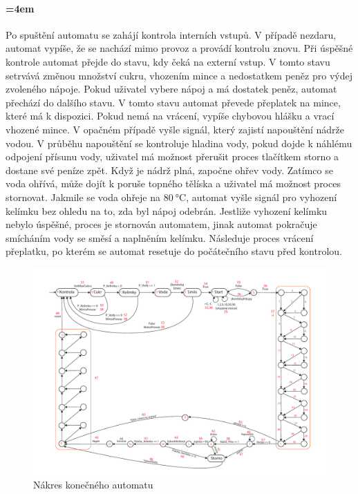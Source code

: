 \documentclass[12pt,a4paper]{article}
\begin{document}
\paragraph{\parindent=4em}{	
	Po spuštění automatu se zahájí kontrola interních vstupů. V případě nezdaru, automat vypíše, že se nachází mimo provoz a provádí kontrolu znovu. Při úspěšné kontrole automat přejde do stavu, kdy čeká na externí vstup. V tomto stavu setrvává změnou množství cukru, vhozením mince a nedostatkem peněz pro výdej zvoleného nápoje. Pokud uživatel vybere nápoj a má dostatek peněz, automat přechází do dalšího stavu. V tomto stavu automat převede přeplatek na mince, které má k dispozici. Pokud nemá na vrácení, vypíše chybovou hlášku a vrací vhozené mince. V opačném případě vyšle signál, který zajistí napouštění nádrže vodou. V průběhu napouštění se kontroluje hladina vody, pokud dojde k náhlému odpojení přísunu vody, uživatel má možnost přerušit proces tlačítkem storno a dostane své peníze zpět. Když je nádrž plná, započne ohřev vody. Zatímco se voda ohřívá, může dojít k poruše topného tělíska a uživatel má možnost proces stornovat. Jakmile se voda ohřeje na $\SI{80}{\degreeCelsius}$, automat vyšle signál pro vyhození kelímku bez ohledu na to, zda byl nápoj odebrán. Jestliže vyhození kelímku nebylo úspěšné, proces je stornován automatem, jinak automat pokračuje smícháním vody se směsí a naplněním kelímku. Následuje proces vrácení přeplatku, po kterém se automat resetuje do počátečního stavu před kontrolou.
}

\begin{figure}[H]	
	\centering
	\includegraphics[angle=-90,width=\textwidth]{doc/kavovar_KA.pdf}
	\caption{Nákres konečného automatu}
\end{figure}
	
\end{document}
